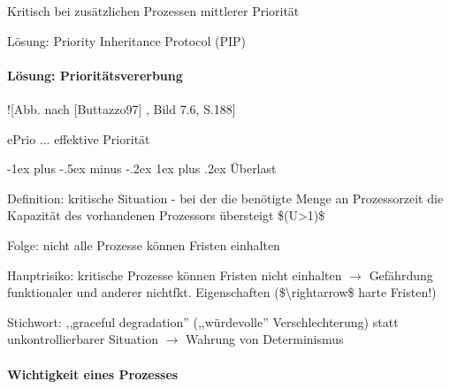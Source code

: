 \documentclass[a4paper]{article}
\makeatletter
\renewcommand{\subsubsection}{\@startsection{subsubsection}{3}{0mm}%
 {-1ex plus -.5ex minus -.2ex}%
 {1ex plus .2ex}%
 {\normalfont\small\bfseries}}
\makeatother
\begin{document}
\begin{multicols}{3}
    \begin{itemize*}
        \item
        Kritisch bei zusätzlichen Prozessen mittlerer Priorität
        \item
        \item
        Lösung: Priority Inheritance Protocol (PIP)
    \end{itemize*}


    \paragraph{Lösung:
        Prioritätsvererbung}

    \begin{itemize*}
        \item
        !{[}Abb. nach {[}Buttazzo97{]} , Bild 7.6, S.188{]}
        \item
        ePrio ... effektive Priorität
    \end{itemize*}


    \subsubsection{Überlast}

    \begin{itemize*}
        \item
        Definition: kritische Situation - bei der die benötigte Menge an
        Prozessorzeit die Kapazität des vorhandenen Prozessors übersteigt
        \$(U\textgreater1)\$
        \begin{itemize*}
            \item Folge: nicht alle Prozesse können Fristen einhalten
        \end{itemize*}
        \item
        Hauptrisiko: kritische Prozesse können Fristen nicht einhalten
        $\rightarrow$  Gefährdung funktionaler und anderer
        nichtfkt. Eigenschaften (\$\textbackslash rightarrow\$ harte Fristen!)
        \item
        Stichwort: ,,graceful degradation'' (,,würdevolle'' Verschlechterung)
        statt unkontrollierbarer Situation $\rightarrow$
        Wahrung von Determinismus
    \end{itemize*}


    \paragraph{Wichtigkeit eines
        Prozesses}


\end{multicols}
\end{document}
